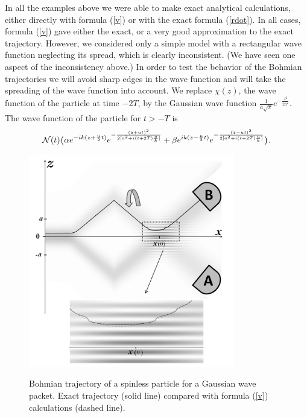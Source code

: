 \documentclass[preprint,tightenlines]{elsarticle}
\begin{document}
In all the examples above we were able to make exact analytical calculations,
either directly with formula (\ref{v}) or with the exact formula
(\ref{rdot}). In all cases, formula (\ref{v}) gave either the exact,
or a very good approximation to the exact trajectory. However, we considered
only a simple model with a rectangular wave function neglecting its
spread, which is clearly inconsistent. (We have seen one aspect of
the inconsistency above.) In order to test the behavior of the Bohmian
trajectories we will avoid sharp edges in the wave function and will
take the spreading of the wave function into account. We replace $\chi(z)$,
the wave function of the particle at time $-2T$, by the Gaussian
wave function $\frac{1}{a\sqrt{\pi}}e^{-\frac{z^{2}}{2a^{2}}}$. The wave function
of the particle for $t>-T$ is
\begin{equation}
{\cal N}(t)\big(\alpha e^{-ik(z+\frac{u}{2}t)}e^{-\frac{(z+ut)^{2}}{2[a^{2}+i(t+2T)\frac{u}{k}]}}+\beta e^{ik(z-\frac{u}{2}t)}e^{-\frac{(z-ut)^{2}}{2[a^{2}+i(t+2T)\frac{u}{k}]}}\big).\label{gaus}
\end{equation}


\begin{figure}[H]\vspace{-20pt}
  \includegraphics[width=9cm]{10.pdf}\\\vspace{-9pt}
      \caption{ Bohmian trajectory of a  spinless particle for a Gaussian wave packet. Exact trajectory (solid line) compared with formula (\ref{v}) calculations (dashed line).}
\end{figure}
\end{document}
